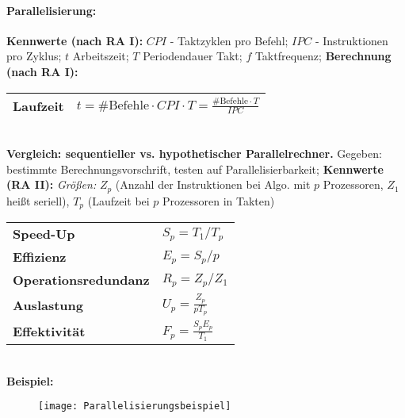 \documentclass[8pt,a4paper]{article}
\begin{document}
\begin{multicols}{2}
\paragraph{Parallelisierung:} \textbf{Kennwerte (nach RA I):} $CPI$ - Taktzyklen
pro Befehl; $IPC$ - Instruktionen pro Zyklus; $t$ Arbeitszeit; $T$
Periodendauer Takt; $f$ Taktfrequenz; \textbf{Berechnung (nach RA I):} 
\begin{tabular}{|ll|}
\hline
\textbf{Laufzeit}            & $t=\#\text{Befehle}\cdot CPI\cdot T=\frac{\#\text{Befehle}\cdot T}{IPC}$ \\
\hline
\end{tabular}                                                                                           \\
\textbf{Vergleich: sequentieller vs. hypothetischer Parallelrechner.} Gegeben: bestimmte Berechnungsvorschrift, testen auf Parallelisierbarkeit; \textbf{Kennwerte (RA II):} \emph{Größen:} $Z_p$ (Anzahl der Instruktionen bei Algo. mit $p$ Prozessoren, $Z_1$ heißt seriell), $T_p$ (Laufzeit bei $p$ Prozessoren in Takten)
\begin{tabular}{|ll|}
\hline
\textbf{Speed-Up}            & $S_p=T_1/T_p$                                                            \\
\textbf{Effizienz}           & $E_p=S_p/p$                                                              \\
\textbf{Operationsredundanz} & $R_p=Z_p/Z_1$                                                            \\
\textbf{Auslastung}          & $U_p=\frac{Z_p}{pT_p}$                                                   \\
\textbf{Effektivität}        & $F_p=\frac{S_pE_p}{T_1}$                                                 \\
\hline
\end{tabular}\\
\textbf{Beispiel:}
\begin{figure}[H]
  \centering
  \texttt{[image: Parallelisierungsbeispiel]}
\end{figure}


\end{multicols}
\end{document}
